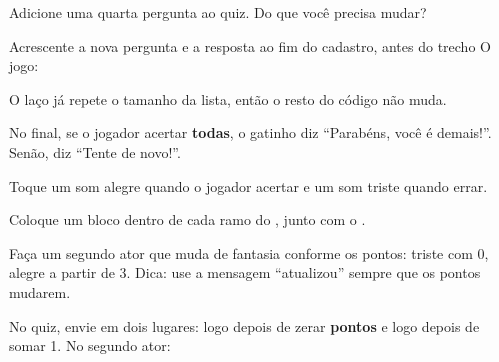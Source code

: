 \begin{exercicio}
Adicione uma quarta pergunta ao quiz. Do que você precisa mudar?
\end{exercicio}

\begin{solucao}
Acrescente a nova pergunta e a resposta ao fim do cadastro, antes do trecho O jogo:
\begin{pilha}
\end{pilha}
O laço já repete o tamanho da lista, então o resto do código não muda.
\end{solucao}

\begin{exercicio}
No final, se o jogador acertar \textbf{todas}, o gatinho diz ``Parabéns, você é demais!''. Senão, diz ``Tente de novo!''.
\end{exercicio}

\begin{solucao}
\begin{pilha}
\sbcend
\end{pilha}
\end{solucao}

\begin{exercicio}
Toque um som alegre quando o jogador acertar e um som triste quando errar.
\end{exercicio}

\begin{solucao}
Coloque um bloco  dentro de cada ramo do , junto com o .
\end{solucao}

\begin{desafio}
Faça um segundo ator que muda de fantasia conforme os pontos: triste com 0, alegre a partir de 3. Dica: use a mensagem ``atualizou'' sempre que os pontos mudarem.
\end{desafio}

\begin{solucao}
No quiz, envie  em dois lugares: logo depois de zerar \textbf{pontos} e logo depois de somar 1. No segundo ator:
\begin{pilha}
\sbcend
\end{pilha}
\end{solucao}
